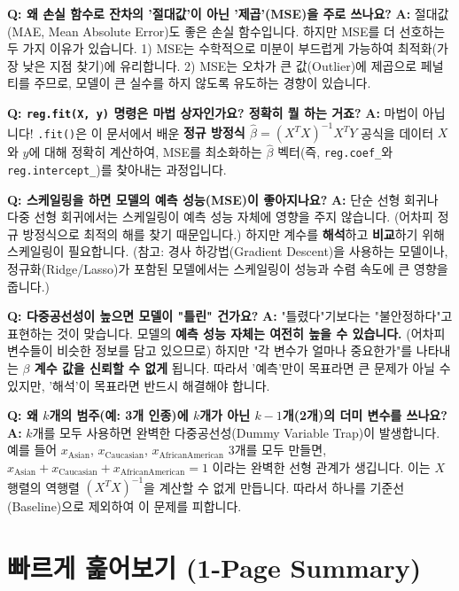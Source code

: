 \documentclass[11pt,a4paper]{book}
\theoremstyle{definition}
\begin{document}
\begin{warningbox}
\textbf{Q: 왜 손실 함수로 잔차의 '절대값'이 아닌 '제곱'(MSE)을 주로 쓰나요?}
\textbf{A:} 절대값(MAE, Mean Absolute Error)도 좋은 손실 함수입니다. 하지만 MSE를 더 선호하는 두 가지 이유가 있습니다. 1) MSE는 수학적으로 미분이 부드럽게 가능하여 최적화(가장 낮은 지점 찾기)에 유리합니다. 2) MSE는 오차가 큰 값(Outlier)에 제곱으로 페널티를 주므로, 모델이 큰 실수를 하지 않도록 유도하는 경향이 있습니다.

\textbf{Q: \texttt{reg.fit(X, y)} 명령은 마법 상자인가요? 정확히 뭘 하는 거죠?}
\textbf{A:} 마법이 아닙니다! \texttt{.fit()}은 이 문서에서 배운 \textbf{정규 방정식 $\hat{\beta} = (X^T X)^{-1} X^T Y$} 공식을 데이터 $X$와 $y$에 대해 정확히 계산하여, MSE를 최소화하는 $\hat{\beta}$ 벡터(즉, \texttt{reg.coef\_}와 \texttt{reg.intercept\_})를 찾아내는 과정입니다.

\textbf{Q: 스케일링을 하면 모델의 예측 성능(MSE)이 좋아지나요?}
\textbf{A:} 단순 선형 회귀나 다중 선형 회귀에서는 스케일링이 예측 성능 자체에 영향을 주지 않습니다. (어차피 정규 방정식으로 최적의 해를 찾기 때문입니다.) 하지만 계수를 \textbf{해석}하고 \textbf{비교}하기 위해 스케일링이 필요합니다. (참고: 경사 하강법(Gradient Descent)을 사용하는 모델이나, 정규화(Ridge/Lasso)가 포함된 모델에서는 스케일링이 성능과 수렴 속도에 큰 영향을 줍니다.)

\textbf{Q: 다중공선성이 높으면 모델이 "틀린" 건가요?}
\textbf{A:} "틀렸다"기보다는 "불안정하다"고 표현하는 것이 맞습니다. 모델의 \textbf{예측 성능 자체는 여전히 높을 수 있습니다.} (어차피 변수들이 비슷한 정보를 담고 있으므로) 하지만 "각 변수가 얼마나 중요한가"를 나타내는 \textbf{$\beta$ 계수 값을 신뢰할 수 없게} 됩니다. 따라서 '예측'만이 목표라면 큰 문제가 아닐 수 있지만, '해석'이 목표라면 반드시 해결해야 합니다.

\textbf{Q: 왜 $k$개의 범주(예: 3개 인종)에 $k$개가 아닌 $k-1$개(2개)의 더미 변수를 쓰나요?}
\textbf{A:} $k$개를 모두 사용하면 완벽한 다중공선성(Dummy Variable Trap)이 발생합니다. 예를 들어 $x_{\text{Asian}}$, $x_{\text{Caucasian}}$, $x_{\text{AfricanAmerican}}$ 3개를 모두 만들면, $x_{\text{Asian}} + x_{\text{Caucasian}} + x_{\text{AfricanAmerican}} = 1$ 이라는 완벽한 선형 관계가 생깁니다. 이는 $X$ 행렬의 역행렬 $(X^T X)^{-1}$을 계산할 수 없게 만듭니다. 따라서 하나를 기준선(Baseline)으로 제외하여 이 문제를 피합니다.
\end{warningbox}


\section{빠르게 훑어보기 (1-Page Summary)}
\end{document}
